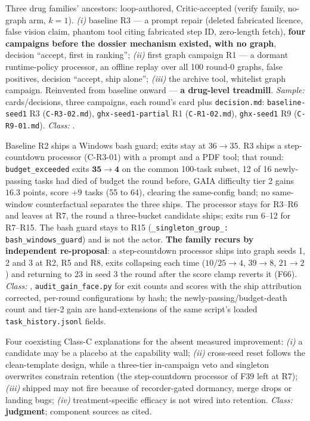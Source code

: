 \begin{description}[leftmargin=0pt,labelindent=0pt,labelsep=0pt,style=nextline,font=\normalfont,itemsep=6pt]
\item[\textbf{F38}\quad Prescription archaeology --- the reversal.]
Three drug families' ancestors: loop-authored, Critic-accepted
(verify family, no-graph arm, $k{=}1$). \emph{(i)} baseline R3 ---
a prompt repair (deleted fabricated licence, false vision claim,
phantom tool citing fabricated step ID, zero-length fetch),
\textbf{four campaigns before the dossier mechanism existed, with no
graph}, decision ``accept, first in ranking''; \emph{(ii)} first graph
campaign R1 --- a dormant runtime-policy processor, an offline replay
over all 100 round-0 graphs, false positives, decision ``accept, ship
alone''; \emph{(iii)} the archive tool, whitelist graph campaign.
Reinvented from baseline onward --- \textbf{a drug-level treadmill}.
\emph{Sample:} cards/decisions, three campaigns, each round's card
plus \texttt{decision.md}:
\texttt{baseline-seed1} R3 (\texttt{C-R3-02.md}),
\texttt{ghx-seed1-partial} R1 (\texttt{C-R1-02.md}), \texttt{ghx-seed1}
R9 (\texttt{C-R9-01.md}). \emph{Class:} .

\item[\textbf{F39}\quad Mechanism-consistent guard event and what became
      of it.]
Baseline R2 ships a Windows bash guard; exits stay at $36 \to 35$. R3
ships a step-countdown processor (C-R3-01) with a prompt and a PDF tool;
that round: \texttt{budget\_\allowbreak exceeded} exits $\mathbf{35 \to 4}$
on the common 100-task subset, 12 of 16 newly-passing tasks had died of
budget the round before, GAIA difficulty tier 2 gains $16.3$ points, score
$+9$ tasks (55 to 64), clearing the same-config band; no same-window
counterfactual separates the three ships. The processor stays for R3--R6
and leaves at R7, the round a three-bucket candidate ships; exits run
6--12 for R7--R15. The bash guard stays to R15
(\texttt{\_singleton\_group\_: bash\_windows\_guard}) and is not the actor.
\textbf{The family recurs by independent re-proposal}: a step-countdown
processor ships into graph seeds 1, 2 and 3 at R2, R5 and R8, exits
collapsing each time ($10/25 \to 4$, $39 \to 8$, $21 \to 2$) and returning
to 23 in seed 3 the round after the score clamp reverts it (F66).
\emph{Class:} , \texttt{audit\_gain\_face.py} for exit counts and
scores with the ship attribution corrected, per-round configurations
by hash; the newly-passing/budget-death count and tier-2 gain are
hand-extensions of the same script's loaded \texttt{task\_history.jsonl}
fields.

\item[\textbf{F40}\quad Four layers of mortality.]
Four coexisting Class-C explanations for the absent measured improvement:
\emph{(i)} a candidate may be a placebo at the capability wall;
\emph{(ii)} cross-seed reset follows the clean-template design, while a
three-tier in-campaign veto and singleton overwrites constrain retention
(the step-countdown processor of F39 left at R7); \emph{(iii)} shipped may not fire because of recorder-gated
dormancy, merge drops or landing bugs; \emph{(iv)} treatment-specific
efficacy is not wired into retention. \emph{Class:} \textbf{ judgment}; component sources as
cited.


\end{description}
